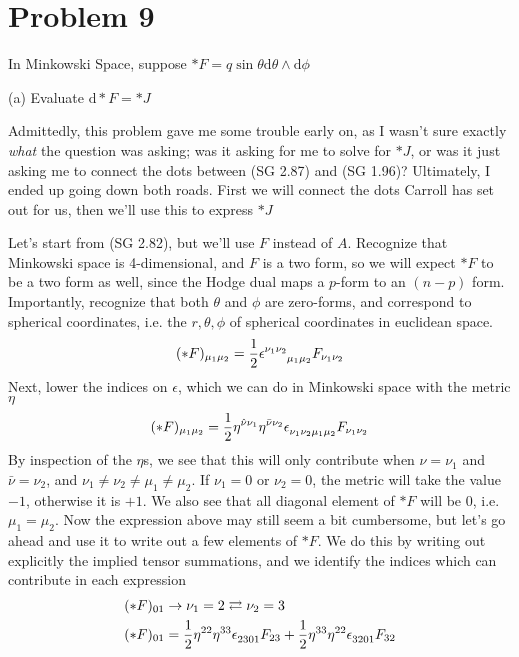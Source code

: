 \section{Problem 9}
In Minkowski Space, suppose $ \ast F = q  \sin{\theta}  \textrm{d} \theta  \wedge  \textrm{d} \phi$

(a) Evaluate  $ \textrm{d} \ast F = \ast J $

Admittedly, this problem gave me some trouble early on, as I wasn't sure exactly \textit{what} the question was asking; was it asking for me to solve for $ \ast J $, or was it just asking me to connect the dots between (SG 2.87) and (SG 1.96)? Ultimately, I ended up going down both roads. First we will connect the dots Carroll has set out for us, then we'll use this to express $ \ast J $ 

Let's start from (SG 2.82), but we'll use $F$ instead of $A$. Recognize that Minkowski space is 4-dimensional, and $F$ is a two form, so we will expect $\ast F$ to be a two form as well, since the Hodge dual maps a $p$-form to an $(n-p)$ form. Importantly, recognize that both $\theta$ and $\phi$ are zero-forms, and correspond to spherical coordinates, i.e. the $r, \theta, \phi$ of spherical coordinates in euclidean space. 
%
\begin{align}
	(\ast F)_{\mu_1 \mu_2} = \frac{1}{2} \epsilon\indices{^{{\nu_1}{\nu_2}}_{{\mu_1}{\mu_2}}} F_{\nu_1 \nu_2}
\end{align} 
%
Next, lower the indices on $\epsilon$, which we can do in Minkowski space with the metric $\eta$
%
\begin{align}
	(\ast F)_{\mu_1 \mu_2} = \frac{1}{2} \eta\indices{^{\hat{\nu}\nu_1}}  \eta\indices{^{\bar{\nu}\nu_2}} \epsilon\indices{_{{\nu_1}{\nu_2}{\mu_1}{\mu_2}}} F_{\nu_1 \nu_2}
\end{align} 
%
By inspection of the $\eta$s, we see that this will only contribute when $\hat{\nu} = \nu_1$ and $\bar{\nu} = \nu_2$, and $\nu_1 \neq \nu_2 \neq \mu_1 \neq \mu_2$. If $\nu_1=0$ or $\nu_2=0$, the metric will take the value $-1$, otherwise it is $+1$. We also see that all diagonal element of $\ast F$ will be $0$, i.e. $\mu_1 = \mu_2$. Now the expression above may still seem a bit cumbersome, but let's go ahead and use it to write out a few elements of $\ast F$. We do this by writing out explicitly the implied tensor summations, and we identify the indices which can contribute in each expression
%
\begin{align}
	&(\ast F)_{0 1} \rightarrow \nu_1 = 2 \rightleftarrows \nu_2 = 3 \\
	&(\ast F)_{0 1} = \frac{1}{2} \eta\indices{^{22}}  \eta\indices{^{33}} \epsilon\indices{_{2301}} F_{23} + \frac{1}{2} \eta\indices{^{33}}  \eta\indices{^{22}} \epsilon\indices{_{3201}} F_{32}
\end{align}
